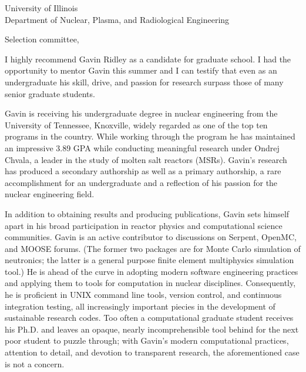 \documentclass[12pt]{letter}
\begin{document}
\signature{Dr. Alexander Lindsay\\ INL Computational Scientist\\\url{alexander.lindsay@inl.gov}}

\begin{letter}{University of Illinois\\ Department of Nuclear, Plasma, and
    Radiological Engineering}
\opening{Selection committee,}

I highly recommend Gavin Ridley as a candidate for graduate school. I had the
opportunity to mentor Gavin this summer and I can testify that even as an
undergraduate his skill, drive, and passion for research surpass those of many senior
graduate students.

Gavin is receiving his undergraduate degree in nuclear engineering from the
University of Tennessee, Knoxville, widely regarded as one of the top ten
programs in the country. While working through the program he has maintained an
impressive 3.89 GPA while conducting meaningful research under Ondrej Chvala, a
leader in the study of molten salt reactors (MSRs). Gavin's research has
produced a secondary authorship as well as a primary authorship, a rare
accomplishment for an undergraduate and a reflection of his passion for the
nuclear engineering field.

In addition to obtaining results and producing publications, Gavin sets himself apart
in his broad participation in reactor physics and computational
science communities. Gavin is an active contributor to discussions on Serpent,
OpenMC, and MOOSE forums. (The former two packages are for Monte Carlo simulation
of neutronics; the latter is a general purpose finite element multiphysics
simulation tool.) He is ahead of the curve in adopting modern software
engineering practices and applying them to tools for computation in nuclear
disciplines. Consequently, he is proficient in UNIX command line tools, version
control, and continuous integration testing, all increasingly important piecies
in the development of sustainable research codes. Too often a computational
graduate student receives his Ph.D. and leaves an opaque, nearly
incomprehensible tool behind for the next poor student to puzzle through; with
Gavin's modern computational practices, attention to detail, and devotion to
transparent research, the aforementioned case is not a concern.


\end{letter}
\end{document}

